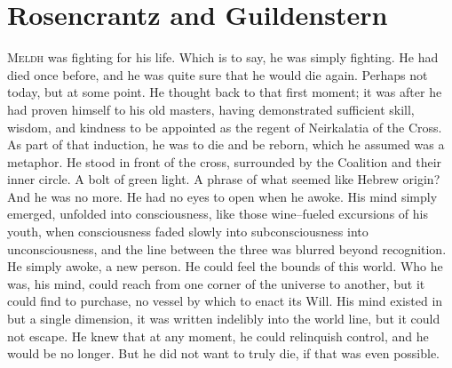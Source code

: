 \chapter{Rosencrantz and Guildenstern}

\simpleline
\pagebreak
\lettrine{M}{eldh} was fighting for his life. Which is to say, he was simply fighting. He had died once before, and he was quite sure that he would die again. Perhaps not today, but at some point. He thought back to that first moment; it was after he had proven himself to his old masters, having demonstrated sufficient skill, wisdom, and kindness to be appointed as the regent of Neirkalatia of the Cross. As part of that induction, he was to die and be reborn, which he assumed was a metaphor. He stood in front of the cross, surrounded by the Coalition and their inner circle.
\SmallVSpace
A bolt of green light. A phrase of what seemed like Hebrew origin? And he was no more.
\SmallVSpace
He had no eyes to open when he awoke. His mind simply emerged, unfolded into consciousness, like those wine\mbox{--}fueled excursions of his youth, when consciousness faded slowly into subconsciousness into unconsciousness, and the line between the three was blurred beyond recognition. He simply awoke, a new person. He could feel the bounds of this world. Who he was, his mind, could reach from one corner of the universe to another, but it could find to purchase, no vessel by which to enact its Will. His mind existed in but a single dimension, it was written indelibly into the world line, but it could not escape. He knew that at any moment, he could relinquish control, and he would be no longer. But he did not want to truly die, if that was even possible.

